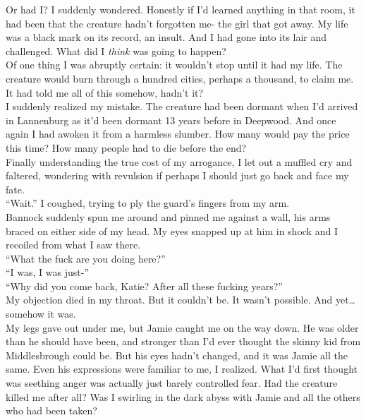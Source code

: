 \documentclass[a5paper]{scrartcl}
\begin{document}
Or had I? I suddenly wondered.  Honestly if I'd learned anything in that room, it had been that the creature hadn't forgotten me- the girl that got away. My life was a black mark on its record, an insult.  And I had gone into its lair and challenged. What did I \textit{think}
 was going to happen?\\


Of one thing I was abruptly certain: it wouldn't stop until it had my life. The creature would burn through a hundred cities, perhaps a thousand, to claim me. It had told me all of this somehow, hadn't it?\\


I suddenly realized my mistake. The creature had been dormant when I'd arrived in Lannenburg as it'd been dormant 13 years before in Deepwood. And once again I had awoken it from a harmless slumber. How many would pay the price this time?   How many people had to die before the end? \\


Finally understanding the true cost of my arrogance, I let out a muffled cry and faltered, wondering with revulsion if perhaps I should just go back and face my fate. \\


\enquote{Wait.} I coughed, trying to ply the guard's fingers from my arm.\\


Bannock suddenly spun me around and pinned me against a wall, his arms braced on either side of my head. My eyes snapped up at him in shock and I recoiled from what I saw there.\\


\enquote{What the fuck are you doing here?}\\


\enquote{I was, I was just-}\\


\enquote{Why did you come back, Katie? After all these fucking years?}\\


My objection died in my throat. But it couldn't be. It wasn't possible. And yet\dots somehow it was.\\


My legs gave out under me, but Jamie caught me on the way down. He was older than he should have been, and stronger than I'd ever thought the skinny kid from Middlesbrough could be. But his eyes hadn't changed, and it was Jamie all the same. Even his expressions were familiar to me, I realized. What I'd first thought was seething anger was actually just barely controlled fear. Had the creature killed me after all? Was I swirling in the dark abyss with Jamie and all the others who had been taken?\\
\end{document}
